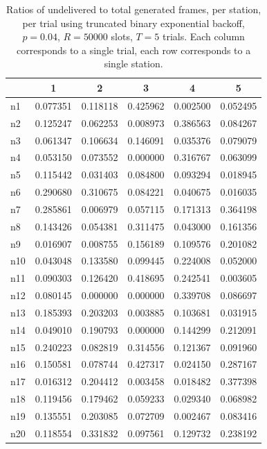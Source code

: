 \documentclass[twocolumn]{article}
\begin{document}
\begin{table}
    \centering 
    \label{fig:fairness_tbeb}
    \begin{tabular}{l|c|c|c|c|c}
           & 1 & 2 & 3 & 4 & 5 \\
        \hline
n1 & 0.077351 & 0.118118 & 0.425962 & 0.002500 & 0.052495 \\
n2 & 0.125247 & 0.062253 & 0.008973 & 0.386563 & 0.084267 \\
n3 & 0.061347 & 0.106634 & 0.146091 & 0.035376 & 0.079079 \\
n4 & 0.053150 & 0.073552 & 0.000000 & 0.316767 & 0.063099 \\
n5 & 0.115442 & 0.031403 & 0.084800 & 0.093294 & 0.018945 \\
n6 & 0.290680 & 0.310675 & 0.084221 & 0.040675 & 0.016035 \\
n7 & 0.285861 & 0.006979 & 0.057115 & 0.171313 & 0.364198 \\
n8 & 0.143426 & 0.054381 & 0.311475 & 0.043000 & 0.161356 \\
n9 & 0.016907 & 0.008755 & 0.156189 & 0.109576 & 0.201082 \\
n10 & 0.043048 & 0.133580 & 0.099445 & 0.224008 & 0.052000 \\
n11 & 0.090303 & 0.126420 & 0.418695 & 0.242541 & 0.003605 \\
n12 & 0.080145 & 0.000000 & 0.000000 & 0.339708 & 0.086697 \\
n13 & 0.185393 & 0.203203 & 0.003885 & 0.103681 & 0.031915 \\
n14 & 0.049010 & 0.190793 & 0.000000 & 0.144299 & 0.212091 \\
n15 & 0.240223 & 0.082819 & 0.314556 & 0.121367 & 0.091960 \\
n16 & 0.150581 & 0.078744 & 0.427317 & 0.024150 & 0.287167 \\
n17 & 0.016312 & 0.204412 & 0.003458 & 0.018482 & 0.377398 \\
n18 & 0.119456 & 0.179462 & 0.059233 & 0.029340 & 0.068982 \\
n19 & 0.135551 & 0.203085 & 0.072709 & 0.002467 & 0.083416 \\
n20 & 0.118554 & 0.331832 & 0.097561 & 0.129732 & 0.238192 
    \end{tabular}
    \caption{ Ratios of undelivered to total generated frames, per station, per trial using
        truncated binary exponential backoff, $p=0.04$, $R=50000$ slots, $T = 5$ trials.  
        Each column corresponds to a single trial, each row corresponds to a single station. }

\end{table}
\end{document}
